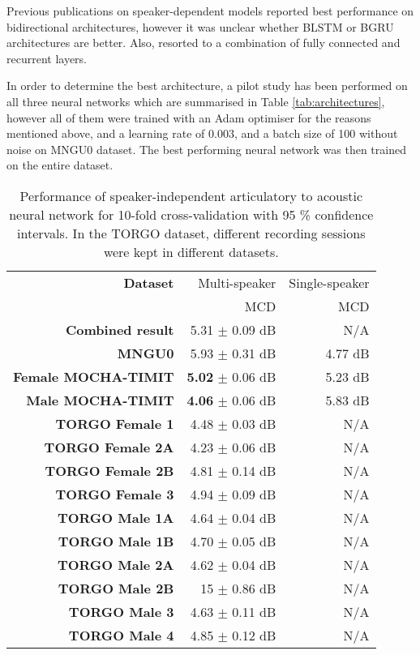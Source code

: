 \documentclass[a4paper]{article}
\begin{document}
Previous publications on speaker-dependent models reported best
performance on bidirectional architectures, however it was unclear whether
BLSTM or BGRU architectures are better. Also, \cite{Taguchi} resorted to
a combination of fully connected and recurrent layers.

In order to determine the best architecture, a pilot study has been
performed on all three neural networks which are summarised in Table \ref{tab:architectures},
however all of them were trained with an Adam optimiser for the reasons mentioned above, and a learning rate
of \( 0.003 \), and a batch size of 100 without noise on MNGU0 dataset.
The best performing neural network was then trained on the entire dataset.

\begin{table}[th]
  \caption{Performance of speaker-independent articulatory to acoustic neural network for 10-fold cross-validation with 95 \% confidence intervals. In the TORGO dataset, different recording sessions were
    kept in different datasets. }
  \vspace{1em}
  \label{tab:all_data}
  \centering
  \footnotesize

  \begin{tabular}{ r r r }
    \toprule
    \textbf{Dataset} & Multi-speaker & Single-speaker \\
    & MCD & MCD \\
    \midrule 
    \textbf{Combined result} & 5.31 $\pm$ 0.09 dB & N/A \\  
    \midrule
    \textbf{MNGU0} & 5.93 $\pm$ 0.31 dB & 4.77 dB \\
    \textbf{Female MOCHA-TIMIT} & \textbf{5.02} $\pm$ 0.06 dB  & 5.23 dB \\
    \textbf{Male MOCHA-TIMIT} & \textbf{4.06} $\pm$ 0.06 dB & 5.83 dB \\
    \textbf{TORGO Female 1} & 4.48 $\pm$ 0.03 dB & N/A \\
    \textbf{TORGO Female 2A} & 4.23 $\pm$ 0.06 dB & N/A \\
    \textbf{TORGO Female 2B} & 4.81 $\pm$ 0.14 dB & N/A \\
    \textbf{TORGO Female 3} & 4.94 $\pm$ 0.09 dB & N/A \\
    \textbf{TORGO Male 1A} & 4.64 $\pm$ 0.04 dB & N/A \\
    \textbf{TORGO Male 1B} & 4.70 $\pm$ 0.05 dB & N/A \\
    \textbf{TORGO Male 2A} & 4.62 $\pm$ 0.04 dB & N/A \\
    \textbf{TORGO Male 2B} & 15 $\pm$ 0.86 dB & N/A\\
    \textbf{TORGO Male 3} & 4.63 $\pm$ 0.11 dB & N/A \\
    \textbf{TORGO Male 4} & 4.85 $\pm$ 0.12 dB & N/A \\
    \bottomrule
  \end{tabular}
\end{table}
\end{document}
